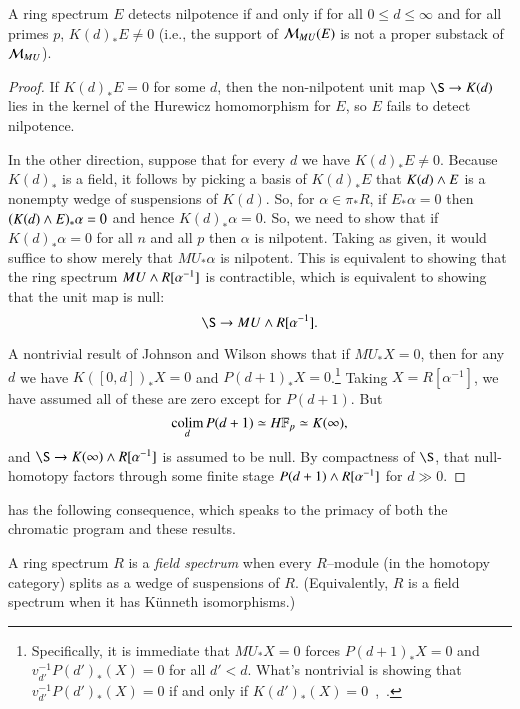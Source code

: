 \begin{corollary}\label{LocalNilpotenceDetection}
A ring spectrum $E$ detects nilpotence if and only if for all $0 \le d \le \infty$ and for all primes $p$, $K(d)_* E \ne 0$ (i.e., the support of $\mathcal{M}_{MU}(E)$ is not a proper substack of $\mathcal{M}_{MU}$).
\end{corollary}
\begin{proof}
If $K(d)_* E = 0$ for some $d$, then the non-nilpotent unit map $\S \to K(d)$ lies in the kernel of the Hurewicz homomorphism for $E$, so $E$ fails to detect nilpotence.

In the other direction, suppose that for every $d$ we have $K(d)_* E \ne 0$.  Because $K(d)_*$ is a field, it follows by picking a basis of $K(d)_* E$ that $K(d) \wedge E$ is a nonempty wedge of suspensions of $K(d)$.  So, for $\alpha \in \pi_* R$, if $E_* \alpha = 0$ then $(K(d) \wedge E)_* \alpha = 0$ and hence $K(d)_* \alpha = 0$.  So, we need to show that if $K(d)_* \alpha = 0$ for all $n$ and all $p$ then $\alpha$ is nilpotent.  Taking  as given, it would suffice to show merely that $MU_* \alpha$ is nilpotent.  This is equivalent to showing that the ring spectrum $MU \wedge R[\alpha^{-1}]$ is contractible, which is equivalent to showing that the unit map is null: \[\S \to MU \sm R[\alpha^{-1}].\]

A nontrivial result of Johnson and Wilson shows that if $MU_* X = 0$, then for any $d$ we have $K([0, d])_* X = 0$ and $P(d+1)_* X = 0$.\footnote{Specifically, it is immediate that $MU_* X = 0$ forces $P(d+1)_* X = 0$ and $v_{d'}^{-1} P(d')_*(X) = 0$ for all $d' < d$.  What's nontrivial is showing that $v_{d'}^{-1} P(d')_*(X) = 0$ if and only if $K(d')_*(X) = 0$~\cite[Theorem 2.1.a]{RavenelLocalizationWRTPeriodic},~\cite[Section 3]{JohnsonWilson}.}  Taking $X = R[\alpha^{-1}]$, we have assumed all of these are zero except for $P(d+1)$.  But \[\colim_d P(d+1) \simeq \HFp \simeq K(\infty),\] and $\S \to K(\infty) \sm R[\alpha^{-1}]$ is assumed to be null.  By compactness of $\S$, that null-homotopy factors through some finite stage $P(d+1) \wedge R[\alpha^{-1}]$ for $d \gg 0$.
\end{proof}

 has the following consequence, which speaks to the primacy of both the chromatic program and these results.

\begin{definition}
A ring spectrum $R$ is a \textit{field spectrum} when every $R$--module (in the homotopy category) splits as a wedge of suspensions of $R$.  (Equivalently, $R$ is a field spectrum when it has K\"unneth isomorphisms.)
\end{definition}

